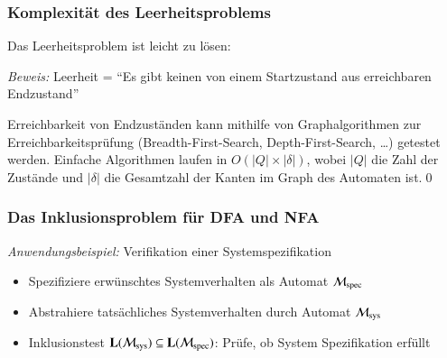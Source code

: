 \documentclass[aspectratio=1610,onlymath]{beamer}
\begin{document}
\begin{frame}\frametitle{Komplexität des Leerheitsproblems}

Das Leerheitsproblem ist leicht zu lösen:


\pause
\emph{Beweis:} Leerheit = "`Es gibt keinen von einem Startzustand aus erreichbaren Endzustand"'
\bigskip

Erreichbarkeit von Endzuständen kann mithilfe von Graphalgorithmen zur Erreichbarkeitsprüfung (Breadth-First-Search, Depth-First-Search, \ldots) getestet werden. Einfache Algorithmen laufen in $O(|Q|\times |\delta|)$, wobei $|Q|$ die Zahl der Zustände und $|\delta|$ die Gesamtzahl der Kanten im Graph des Automaten ist.\qed

\end{frame}

\begin{frame}\frametitle{Das Inklusionsproblem für DFA und NFA}


\emph{Anwendungsbeispiel:}
Verifikation einer Systemspezifikation
\begin{itemize}
\item Spezifiziere erwünschtes Systemverhalten als Automat $\mathcal{M}_{\text{spec}}$
\item Abstrahiere tatsächliches Systemverhalten durch Automat $\mathcal{M}_{\text{sys}}$
\item Inklusionstest $\textbf{\textcolor{black}{L}}(\mathcal{M}_{\text{sys}})\subseteq\textbf{\textcolor{black}{L}}(\mathcal{M}_{\text{spec}})$: Prüfe, ob System Spezifikation erfüllt
\end{itemize}

\end{frame}
\end{document}
